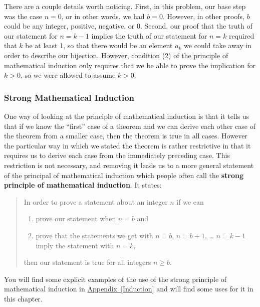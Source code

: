 \documentclass[10pt,]{book}
\newcommand{\terminology}[1]{\textbf{#1}}
\theoremstyle{plain}
\theoremstyle{definition}
\theoremstyle{definition}
\numberwithin{equation}{chapter}
\begin{document}
\par
There are a couple details worth noticing. First, in this problem, our base step was the case \(n=0\), or in other words, we had \(b=0\). However, in other proofs, \(b\) could be any integer, positive, negative, or 0. Second, our proof that the truth of our statement for \(n=k-1\) implies the truth of our statement for \(n=k\) required that \(k\) be at least 1, so that there would be an element \(a_k\) we could take away in order to describe our bijection. However, condition (2) of the principle of mathematical induction only requires that we be able to prove the implication for \(k>0\), so we were allowed to assume \(k>0\).%
\typeout{************************************************}
\typeout{************************************************}
\subsubsection[{Strong Mathematical Induction}]{Strong Mathematical Induction}\label{subsubsection-1}
One way of looking at the principle of mathematical induction is that it tells us that if we know the ``first'' case of a theorem and we can derive each other case of the theorem from a smaller case, then the theorem is true in all cases. However the particular way in which we stated the theorem is rather restrictive in that it requires us to derive each case from the immediately preceding case. This restriction is not necessary, and removing it leads us to a more general statement of the principal of mathematical induction which people often call the \terminology{strong principle of mathematical induction}. It states:%
\begin{quote}\hypertarget{blockquote-8}{}
In order to prove a statement about an integer \(n\) if we can \leavevmode%
\begin{enumerate}
\item\hypertarget{li-7}{}prove our statement when \(n=b\) and%
\item\hypertarget{li-8}{}prove that the statements we get with \(n=b\), \(n=b+1\), \dots{} \(n=k-1\) imply the statement with \(n=k\),%
\end{enumerate}
 then our statement is true for all integers \(n\ge b\).%
\end{quote}
You will find some explicit examples of the use of the strong principle of mathematical induction in \hyperref[Induction]{Appendix~\ref{Induction}} and will find some uses for it in this chapter.%
\typeout{************************************************}
\typeout{************************************************}
\end{document}
